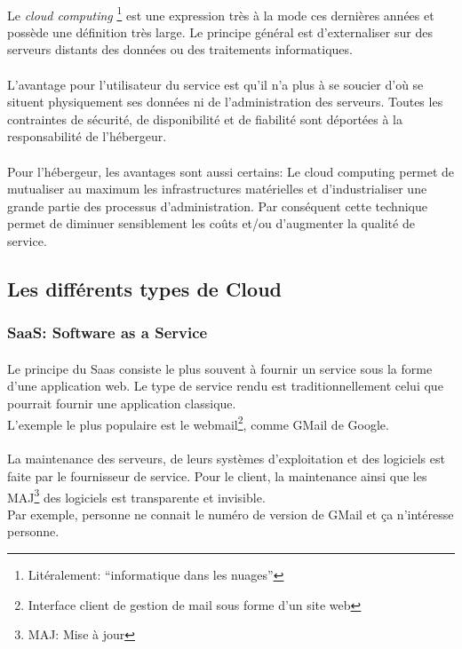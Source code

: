 \paragraph*{}
Le \emph{cloud computing} \footnote{Litéralement: ``informatique dans les nuages''} est une expression
très à la mode ces dernières années et possède une définition très large.
Le principe général est d'externaliser sur des serveurs distants des données ou
des traitements informatiques.

\paragraph*{}
L'avantage pour l'utilisateur du service est qu'il n'a plus à se soucier d'où se situent physiquement
ses données ni de l'administration des serveurs. Toutes les contraintes de sécurité, de disponibilité
et de fiabilité sont déportées à la responsabilité de l'hébergeur.

\paragraph*{}
Pour l'hébergeur, les avantages sont aussi certains: Le cloud computing permet de mutualiser au maximum
les infrastructures matérielles et d'industrialiser une grande partie des processus d'administration.
Par conséquent cette technique permet de diminuer sensiblement les coûts et/ou d'augmenter la qualité
de service.

\subsection{Les différents types de Cloud}

\subsubsection{SaaS: Software as a Service}
\paragraph*{}
Le principe du Saas consiste le plus souvent à fournir un service sous la forme d'une application web.
Le type de service rendu est traditionnellement celui que pourrait fournir une application classique.
\\
L'exemple le plus populaire est le webmail\footnote{Interface client de gestion de mail sous forme d'un site web}, comme GMail de Google.

\paragraph*{}
La maintenance des serveurs, de leurs systèmes d'exploitation et des logiciels est faite par le fournisseur de service.
Pour le client, la maintenance ainsi que les MAJ\footnote{MAJ: Mise à jour} des logiciels est transparente et invisible.
\\
Par exemple, personne ne connait le numéro de version de GMail et ça n'intéresse personne.

